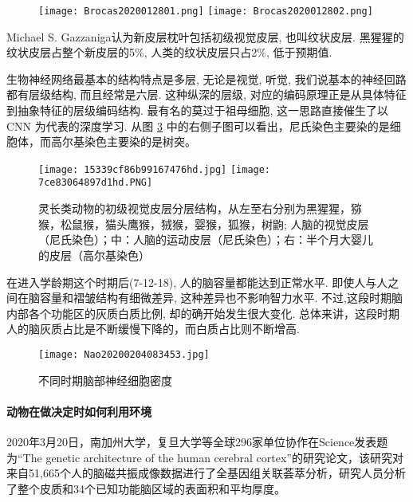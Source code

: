 \begin{itemize}
    \begin{figure}[H]
    \begin{center}
    \quad\quad\quad
    \texttt{[image: Brocas2020012801.png]}
    \texttt{[image: Brocas2020012802.png]}
    \end{center}
    \label{Brocas2020012801}
    \end{figure}
      Michael S. Gazzaniga认为新皮层枕叶包括初级视觉皮层, 也叫纹状皮层. 黑猩猩的纹状皮层占整个新皮层的5\%, 人类的纹状皮层只占2\%, 低于预期值.

      生物神经网络最基本的结构特点是多层, 无论是视觉, 听觉, 我们说基本的神经回路都有层级结构, 而且经常是六层. 这种纵深的层级, 对应的编码原理正是从具体特征到抽象特征的层级编码结构.
      最有名的莫过于祖母细胞, 这一思路直接催生了以 CNN 为代表的深度学习. 从图 \ref{Glutamine013001} 中的右侧子图可以看出，尼氏染色主要染的是细胞体，而高尔基染色主要染的是树突。
    \begin{figure}[H]
    \begin{center}\quad
    \texttt{[image: 15339cf86b99167476hd.jpg]}
    \texttt{[image: 7ce83064897d1hd.PNG]}
    \end{center}
    \caption{灵长类动物的初级视觉皮层分层结构，从左至右分别为黑猩猩，猕猴，松鼠猴，猫头鹰猴，狨猴，婴猴，狐猴，树鼩; 人脑的视觉皮层（尼氏染色）；中：人脑的运动皮层（尼氏染色）；右：半个月大婴儿的皮层（高尔基染色）}
    \label{Glutamine013001}
    \end{figure}

在进入学龄期这个时期后(7-12-18), 人的脑容量都能达到正常水平. 即使人与人之间在脑容量和褶皱结构有细微差异, 这种差异也不影响智力水平. 不过,这段时期脑内部各个功能区的灰质白质比例, 却的确开始发生很大变化.
总体来讲，这段时期人的脑灰质占比是不断缓慢下降的，而白质占比则不断增高.
    \begin{figure}[H]
    \begin{center}\quad
    \texttt{[image: Nao20200204083453.jpg]}
    \end{center}
    \caption{不同时期脑部神经细胞密度}
    \label{Glutamine013001}
    \end{figure}
\paragraph{动物在做决定时如何利用环境}

2020年3月20日，南加州大学，复旦大学等全球296家单位协作在Science发表题为“The genetic architecture of the human cerebral cortex”的研究论文，该研究对来自51,665个人的脑磁共振成像数据进行了全基因组关联荟萃分析，研究人员分析了整个皮质和34个已知功能脑区域的表面积和平均厚度。


\end{itemize}
